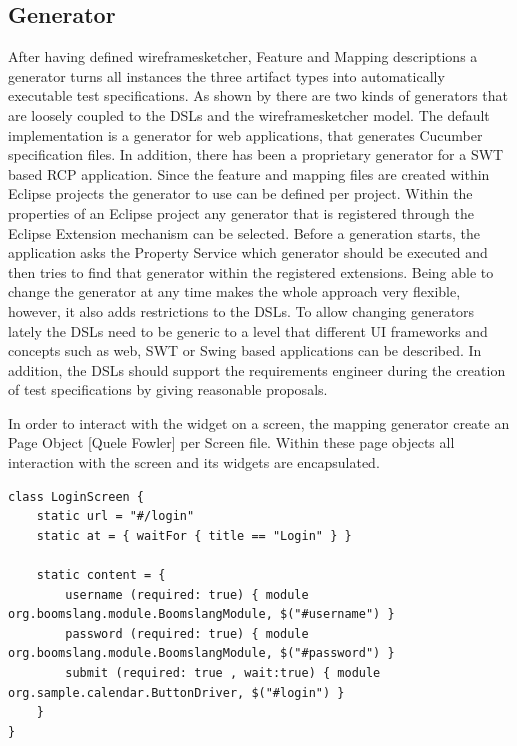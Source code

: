 \documentclass{sig-alternate-05-2015}
\begin{document}
\subsection{Generator}\label{sec:Generator} 
After having defined wireframesketcher, Feature and Mapping descriptions a generator turns all instances the three artifact types into automatically executable test specifications.
As shown by  there are two kinds of generators that are loosely coupled to the DSLs and the wireframesketcher model.
The default implementation is a generator for web applications, that generates Cucumber specification files.
In addition, there has been a proprietary generator for a SWT based RCP application.
Since the feature and mapping files are created within Eclipse projects the generator to use can be defined per project.
Within the properties of an Eclipse project any generator that is registered through the Eclipse Extension mechanism can be selected.
Before a generation starts, the application asks the Property Service which generator should be executed and then tries to find that generator within the registered extensions.
Being able to change the generator at any time makes the whole approach very flexible, however, it also adds restrictions to the DSLs.
To allow changing generators lately the DSLs need to be generic to a level that different UI frameworks and concepts such as web, SWT or Swing based applications can be described.
In addition, the DSLs should support the requirements engineer during the creation of test specifications by giving reasonable proposals.

In order to interact with the widget on a screen, the mapping generator create an Page Object [Quele Fowler] per Screen file.
Within these page objects all interaction with the screen and its widgets are encapsulated.

\begin{lstlisting}[captionpos=b, caption=Generated Page Object, label={lst:MappingGenerated}, language=dsl]
class LoginScreen {
	static url = "#/login"
	static at = { waitFor { title == "Login" } }
	
	static content = {
		username (required: true) { module org.boomslang.module.BoomslangModule, $("#username") }
		password (required: true) { module org.boomslang.module.BoomslangModule, $("#password") }
		submit (required: true , wait:true) { module org.sample.calendar.ButtonDriver, $("#login") }
	}
}
\end{lstlisting}
\end{document}
